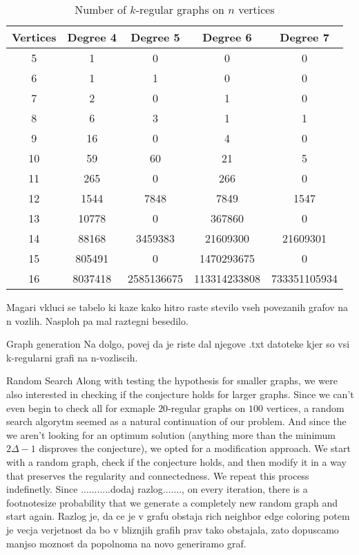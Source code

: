 \documentclass[12pt,a4paper]{amsart}
\makeatletter
\renewcommand\section{\@startsection{section}{1}
  \z@{.5\linespacing\@plus.7\linespacing}{.5\linespacing}
  {\normalfont\scshape\large\centering}}
\renewcommand\subsection{\@startsection{subsection}{2}
  \z@{.5\linespacing\@plus.7\linespacing}{.5\linespacing}
  {\normalfont\scshape}}
\theoremstyle{definition} %
\theoremstyle{plain} %
\makeatother
\begin{document}
\begin{table}[!htbp]\label{tab1}
    \centering
    \begin{tabular}{|c|c|c|c|c|}
        \hline
        Vertices & Degree 4 & Degree 5 & Degree 6 & Degree 7 \\
        \hline
        5 & 1 & 0 & 0 & 0 \\
        6 & 1 & 1 & 0 & 0 \\
        7 & 2 & 0 & 1 & 0 \\
        8 & 6 & 3 & 1 & 1 \\
        9 & 16 & 0 & 4 & 0 \\
        10 & 59 & 60 & 21 & 5 \\
        11 & 265 & 0 & 266 & 0 \\
        12 & 1544 & 7848 & 7849 & 1547 \\
        13 & 10778 & 0 & 367860 & 0 \\
        14 & 88168 & 3459383 & 21609300 & 21609301 \\
        15 & 805491 & 0 & 1470293675 & 0 \\
        16 & 8037418 & 2585136675 & 113314233808 & 733351105934 \\
        \hline
    \end{tabular}
    \caption{Number of $k$-regular graphs on $n$ vertices}
\end{table}


    Magari vkluci se tabelo ki kaze kako hitro raste stevilo vseh povezanih grafov na n vozlih.
    Nasploh pa mal raztegni besedilo.

    \subsection{Graph generation}
        Na dolgo, povej da je riste dal njegove .txt datoteke kjer so vsi k-regularni grafi na n-vozliscih. 

\section{Random Search}
    Along with testing the hypothesis for smaller graphs, we were also interested in checking if the conjecture holds for larger graphs. Since we can't even begin to check all for exmaple $20$-regular graphs on $100$ vertices, a random search algorytm seemed as a natural continuation of our problem. And since the we aren't looking for an optimum solution (anything more than the minimum $2 \Delta - 1$ disproves the conjecture), we opted for a modification approach. We start with a random graph, check if the conjecture holds, and then 
    modify it in a way that preserves the regularity and connectedness. We repeat this process indefinetly. Since ...........dodaj razlog......., on every iteration, there is a footnotesize probability that we generate a completely new random graph and start again.  Razlog je, da ce je v grafu obstaja rich neighbor edge coloring potem je vecja verjetnost da bo v bliznjih grafih prav tako obstajala, zato dopuscamo manjso moznost da popolnoma na novo generiramo graf.
\end{document}
